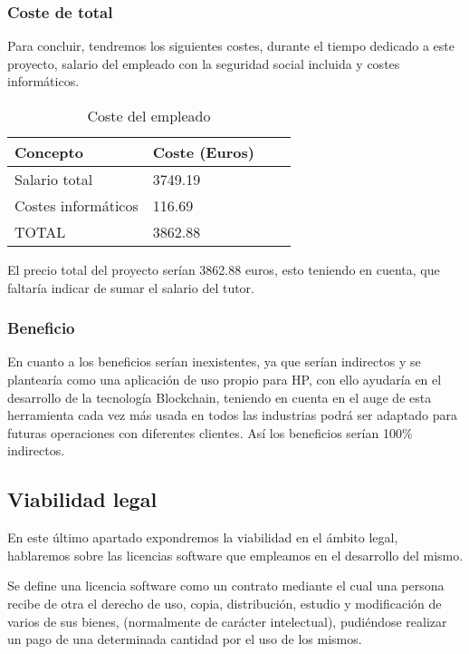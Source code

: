 \subsubsection{Coste de total}

Para concluir, tendremos los siguientes costes, durante el tiempo dedicado a este proyecto, salario del empleado con la seguridad social incluida y costes informáticos.

\begin{table}[H]
	\begin{center}
		\begin{tabular}{llll}
			Concepto              & Coste (Euros)\\ \hline
			Salario total         & 3749.19  \\ \hline	
			Costes informáticos	  & 116.69    \\ \hline
			TOTAL                 & 3862.88     \\
		\end{tabular}
	\caption{Coste del empleado}
	\label{tabla:tabla4}
	\end{center}
\end{table}

El precio total del proyecto serían 3862.88 euros, esto teniendo en cuenta, que faltaría indicar de sumar el salario del tutor.

\subsubsection{Beneficio}

En cuanto a los beneficios serían inexistentes, ya que serían indirectos y se plantearía como una aplicación de uso propio para HP, con ello ayudaría en el desarrollo de la tecnología Blockchain, teniendo en cuenta en el auge de esta herramienta cada vez más usada en todos las industrias podrá ser adaptado para futuras operaciones con diferentes clientes. Así los beneficios serían 100\% indirectos. 


\subsection{Viabilidad legal}

En este último apartado expondremos la viabilidad en el ámbito legal, hablaremos sobre las licencias software que empleamos en el desarrollo del mismo.

Se define una licencia software \cite{licencia} como un contrato mediante el cual una persona recibe de otra el derecho de uso, copia, distribución, estudio y modificación de varios de sus bienes, (normalmente de carácter intelectual), pudiéndose realizar un pago de una determinada cantidad por el uso de los mismos.

